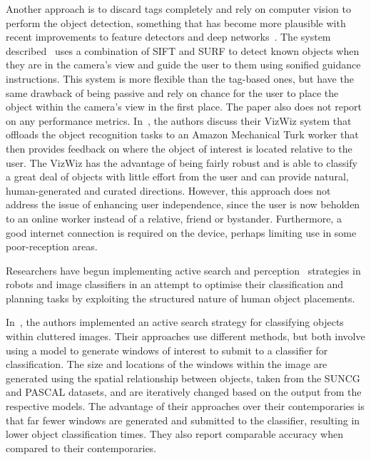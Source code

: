 \documentclass[a4paper, twoside]{article}
\begin{document}
Another approach is to discard tags completely and rely on computer vision to perform the object detection, something that has become more plausible with recent improvements to feature detectors and deep networks~\cite{huang2017speed,redmon2016you}. The system described~\cite{schauerte2012assistive} uses a combination of SIFT and SURF to detect known objects when they are in the camera's view and guide the user to them using sonified guidance instructions. This system is more flexible than the tag-based ones, but have the same drawback of being passive and rely on chance for the user to place the object within the camera's view in the first place. The paper also does not report on any performance metrics. In~\cite{bigham2010vizwiz}, the authors discuss their VizWiz system that offloads the object recognition tasks to an Amazon Mechanical Turk worker that then provides feedback on where the object of interest is located relative to the user. The VizWiz has the advantage of being fairly robust and is able to classify a great deal of objects with little effort from the user and can provide natural, human-generated and curated directions. However, this approach does not address the issue of enhancing user independence, since the user is now beholden to an online worker instead of a relative, friend or bystander. Furthermore, a good internet connection is required on the device, perhaps limiting use in some poor-reception areas.

Researchers have begun implementing active search and perception~\cite{aloimonos2013active} strategies in robots and image classifiers in an attempt to optimise their classification and planning tasks by exploiting the structured nature of human object placements. 

In~\cite{caicedo2015active,gonzalez2015active}, the authors implemented an active search strategy for classifying objects within cluttered images. Their approaches use different methods, but both involve using a model to generate windows of interest to submit to a classifier for classification. The size and locations of the windows within the image are generated using the spatial relationship between objects, taken from the SUNCG and PASCAL datasets, and are iteratively changed based on the output from the respective models. The advantage of their approaches over their contemporaries is that far fewer windows are generated and submitted to the classifier, resulting in lower object classification times. They also report comparable accuracy when compared to their contemporaries. 
\end{document}

